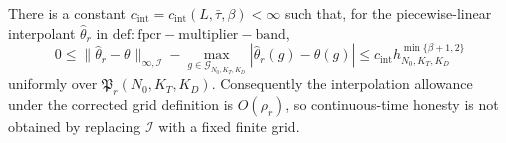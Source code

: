 There is a constant \(c_{\mathrm{int}}=c_{\mathrm{int}}(L,\bar\tau,\beta)<\infty\) such that, for the piecewise-linear interpolant \(\widehat\theta_r\) in \(\mathrm{def:fpcr-multiplier-band}\),
\[
 0\le \|\widehat\theta_r-\theta\|_{\infty,\mathcal I}
 -\max_{g\in\mathcal G_{N_0,K_T,K_D}}|\widehat\theta_r(g)-\theta(g)|
 \le c_{\mathrm{int}}h_{N_0,K_T,K_D}^{\min\{\beta+1,2\}}
\]
uniformly over \(\mathfrak P_r(N_0,K_T,K_D)\).  Consequently the interpolation allowance under the corrected grid definition is \(O(\rho_r)\), so continuous-time honesty is not obtained by replacing \(\mathcal I\) with a fixed finite grid.